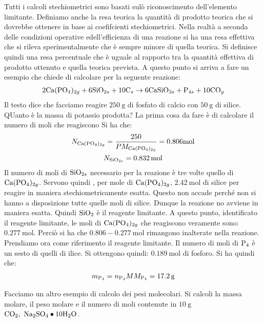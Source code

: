 \documentclass[../AppuntiChimica]{subfiles}
\begin{document}
	 Tutti i calcoli stechiometrici sono basati sulò riconoscimento dell'elemento limitante. Definiamo anche la resa teorica la quantità di prodotto teorica che si dovrebbe ottenere in base ai coefifcienti stechiometrici. Nella realtà a seconda delle condizioni operative edell'efficienza di una reazione si ha una resa effettiva che si rileva sperimentalmente che è sempre minore di quella teorica. Si definisce quindi una resa percentuale che è uguale al rapporto tra la quantità effettiva di prodotto ottenuto e quella teorica prevista. A questo punto si arriva a fare un esempio che chiede di calcolare per la seguente reazione:
	 \begin{gather*}
	 2\text{Ca}(\text{P}\text{O}_{4})_{2g}+6\text{Si}\text{O}_{2s}+10\text{C}_{s}\to 6\text{Ca}\text{Si}\text{O}_{3s}+\text{P}_{4s}+10\text{CO}_{g}
	 \end{gather*}
	 Il testo dice che facciamo reagire $ \SI{250}{\gram} $ di fosfato di calcio con $\SI{50}{\gram} $ di silice. QUanto è la massa di potassio prodotta?
	 La prima cosa da fare è di calcolare il numero di moli che reagiscono Si ha che:
	 \begin{gather*}
		 N_{\text{Ca}(\text{P}\text{O}_{4})_{2g}}=\dfrac{250}{PM_{\text{Ca}(\text{P}\text{O}_{4})_{2g}}}=0.806\text{mol} \\
		 N_{\text{Si}\text{O}_{2s}}=\SI{0.832}{\mole}
	 \end{gather*}
	Il numero di moli di $ \text{Si}\text{O}_{2s} $ necessario per la reazione è tre volte quello di $ \text{Ca}(\text{P}\text{O}_{4})_{2g} $. Servono quindi , per mole di $ \text{Ca}(\text{P}\text{O}_{4})_{2g} $, $ \SI{2.42}{\mole} $ di silice per reagire in maniera stechiometricamente esatta. Questo non accade perché non si hanno a disposizione tutte quelle moli di silice. Dunque la reazione no avviene in maniera esatta. Quindi $ \text{SiO}_{2} $ è il reagente limitante. A questo punto, identificato il reagente limitante, le moli di $ \text{Ca}(\text{P}\text{O}_{4})_{2g} $ che reagiscono veramente sono: $ \SI{0.277}{\mole} $. Perciò si ha che $ 0.806-\SI{0.277}{\mole} $ rimangono inalterate nella reazione. Prendiamo ora come riferimento il reagente limitante. Il numero di moli di $ \text{P}_{4} $ è un sesto di quelli di ilice. Si ottengono quindi: $ \SI{0.189}{\mole} $ di fosforo. Si ha quindi che:
	\begin{gather*}
		m_{\text{P}_{4}}=n_{\text{P}_{4}}MM_{\text{P}_{4}}=\SI{17.2}{\gram}
	\end{gather*}
	
	Facciamo un altro esempio di calcolo dei pesi molecolari. Si calcoli la massa molare, il peso molare e il numero di moli contenute in $ \SI{10}{\gram} $ $ \chem{CO}_{2},\ \chem{Na}_{2}\chem{SO}_{4}\bullet10\chem{H}_{2}\chem{O}$.
	
\end{document}
